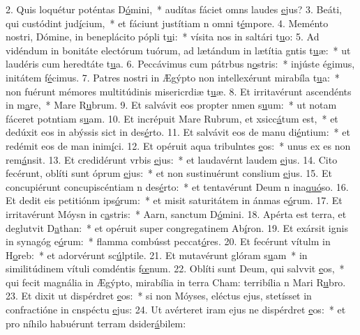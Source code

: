 2. Quis loquétur poténtas D\uline{ó}mini,~* audítas fáciet omns laudes \uline{e}jus?
3. Beáti, qui custódint jud\uline{í}cium,~* et fáciunt justítiam n omni t\uline{é}mpore.
4. Meménto nostri, Dómine, in beneplácito pópli t\uline{u}i:~* vísita nos in saltári t\uline{u}o:
5. Ad vidéndum in bonitáte electórum tuórum, ad lætándum in lætítia gntis t\uline{u}æ:~* ut laudéris cum heredtáte t\uline{u}a.
6. Peccávimus cum pátrbus n\uline{o}stris:~* injúste égimus, initátem f\uline{é}cimus.
7. Patres nostri in Ægýpto non intellexérunt mirabíla t\uline{u}a:~* non fuérunt mémores multitúdinis misericrdiæ t\uline{u}æ.
8. Et irritavérunt ascendénts in m\uline{a}re,~* Mare R\uline{u}brum.
9. Et salvávit eos propter nmen s\uline{u}um:~* ut notam fáceret potntiam s\uline{u}am.
10. Et incrépuit Mare Rubrum, et xsicc\uline{á}tum est,~* et dedúxit eos in abýssis sict in des\uline{é}rto.
11. Et salvávit eos de manu di\uline{é}ntium:~* et redémit eos de man inim\uline{í}ci.
12. Et opéruit aqua tribulntes \uline{e}os:~* unus ex es non rem\uline{á}nsit.
13. Et credidérunt vrbis \uline{e}jus:~* et laudavérnt laudem \uline{e}jus.
14. Cito fecérunt, oblíti sunt óprum \uline{e}jus:~* et non sustinuérunt conslium \uline{e}jus.
15. Et concupiérunt concupiscéntiam n des\uline{é}rto:~* et tentavérunt Deum n ina\uline{quó}so.
16. Et dedit eis petitiónm ips\uline{ó}rum:~* et misit saturitátem in ánmas e\uline{ó}rum.
17. Et irritavérunt Móysn in c\uline{a}stris:~* Aarn, sanctum D\uline{ó}mini.
18. Apérta est terra, et deglutvit D\uline{a}than:~* et opéruit super congregatinem Ab\uline{í}ron.
19. Et exársit ignis in synagóg e\uline{ó}rum:~* flamma combússt peccat\uline{ó}res.
20. Et fecérunt vítulm in H\uline{o}reb:~* et adorvérunt sc\uline{ú}lptile.
21. Et mutavérunt glóram s\uline{u}am~* in similitúdinem vítuli comdéntis f\uline{œ}num.
22. Oblíti sunt Deum, qui salvvit \uline{e}os,~* qui fecit magnália in Ægýpto, mirabília in terra Cham: terribília n Mari R\uline{u}bro.
23. Et dixit ut dispérdret \uline{e}os:~* si non Móyses, eléctus ejus, stetísset in confractióne in cnspéctu \uline{e}jus:
24. Ut avérteret iram ejus ne dispérdret \uline{e}os:~* et pro níhilo habuérunt terram dsider\uline{á}bilem:

